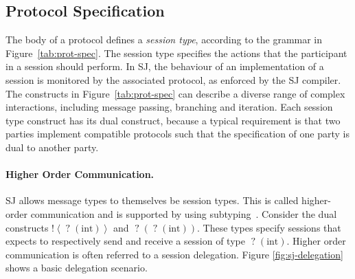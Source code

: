 \documentclass[10pt]{llncs}
\begin{document}
\subsection{Protocol Specification}

The body of a protocol defines a \textit{session type}, according to the grammar in Figure~\ref{tab:prot-spec}.
The session type specifies the actions that the participant in a session should perform. In SJ, the behaviour of an implementation of a session is monitored by the associated protocol, as enforced by the SJ compiler. %
The constructs in Figure~\ref{tab:prot-spec} can describe a diverse range of complex interactions, including message passing, branching and iteration. Each session type construct has its dual construct, because a typical requirement is that two parties implement compatible protocols such that the specification of one party is dual to another party.



\paragraph{Higher Order Communication.}

SJ allows message types to themselves be session types. This is called higher-order communication and is supported by using subtyping~\cite{higher-order-comm}.
Consider the dual constructs $\mathopen{!}\left<\mathopen{?}\left(\text{int}\right)\right>$ and $\mathopen{?}\left(\mathopen{?}\left(\text{int}\right)\right)$. 
These types specify sessions that expects to respectively send and receive a session of type $\mathopen{?}\left(\text{int}\right)$.
Higher order communication is often referred to a session delegation. Figure \ref{fig:sj-delegation} shows a basic delegation scenario.
\end{document}
